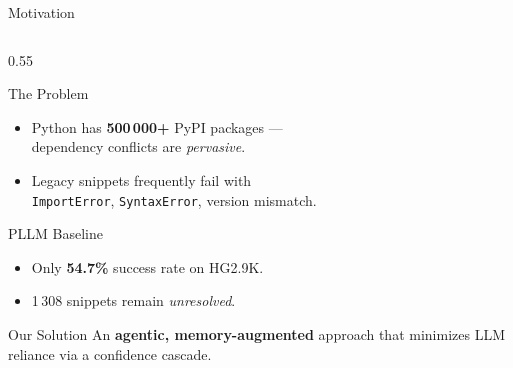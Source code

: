 \documentclass[aspectratio=169]{beamer}
\begin{document}
\begin{frame}{Motivation}
\begin{columns}[T]

\begin{column}{0.55\textwidth}
\begin{block}{\faExclamationTriangle\quad The Problem}
\begin{itemize}
  \item Python has \textbf{500\,000+} PyPI packages ---\\
        dependency conflicts are \emph{pervasive}.
  \item Legacy snippets frequently fail with\\
        \texttt{ImportError}, \texttt{SyntaxError}, version mismatch.
\end{itemize}
\end{block}

\begin{alertblock}{\faBug\quad PLLM Baseline}
\begin{itemize}
  \item Only \textbf{54.7\%} success rate on HG2.9K.
  \item 1\,308 snippets remain \emph{unresolved}.
\end{itemize}
\end{alertblock}

\begin{exampleblock}{\faLightbulb[regular]\quad Our Solution}
An \textbf{agentic, memory-augmented} approach that minimizes LLM reliance via a confidence cascade.
\end{exampleblock}
\end{column}


\end{columns}
\end{frame}
\end{document}
